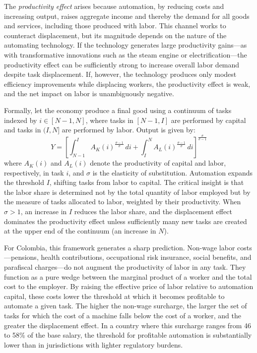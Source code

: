 The \textit{productivity effect} arises because automation, by reducing costs and increasing output, raises aggregate income and thereby the demand for all goods and services, including those produced with labor. This channel works to counteract displacement, but its magnitude depends on the nature of the automating technology. If the technology generates large productivity gains---as with transformative innovations such as the steam engine or electrification---the productivity effect can be sufficiently strong to increase overall labor demand despite task displacement. If, however, the technology produces only modest efficiency improvements while displacing workers, the productivity effect is weak, and the net impact on labor is unambiguously negative.

Formally, let the economy produce a final good using a continuum of tasks indexed by $i \in [N-1, N]$, where tasks in $[N-1, I]$ are performed by capital and tasks in $(I, N]$ are performed by labor. Output is given by:
\begin{equation}
Y = \left[\int_{N-1}^{I} A_K(i)^{\frac{\sigma-1}{\sigma}} \, di + \int_{I}^{N} A_L(i)^{\frac{\sigma-1}{\sigma}} \, di \right]^{\frac{\sigma}{\sigma-1}}
\label{eq:task_production}
\end{equation}
where $A_K(i)$ and $A_L(i)$ denote the productivity of capital and labor, respectively, in task $i$, and $\sigma$ is the elasticity of substitution. Automation expands the threshold $I$, shifting tasks from labor to capital. The critical insight is that the labor share is determined not by the total quantity of labor employed but by the measure of tasks allocated to labor, weighted by their productivity. When $\sigma > 1$, an increase in $I$ reduces the labor share, and the displacement effect dominates the productivity effect unless sufficiently many new tasks are created at the upper end of the continuum (an increase in $N$).

For Colombia, this framework generates a sharp prediction. Non-wage labor costs---pensions, health contributions, occupational risk insurance, social benefits, and parafiscal charges---do not augment the productivity of labor in any task. They function as a pure wedge between the marginal product of a worker and the total cost to the employer. By raising the effective price of labor relative to automation capital, these costs lower the threshold at which it becomes profitable to automate a given task. The higher the non-wage surcharge, the larger the set of tasks for which the cost of a machine falls below the cost of a worker, and the greater the displacement effect. In a country where this surcharge ranges from 46 to 58\% of the base salary, the threshold for profitable automation is substantially lower than in jurisdictions with lighter regulatory burdens.


